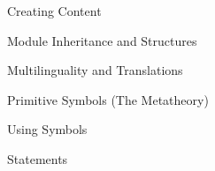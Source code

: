 \begin{sfragment}{Creating \sTeX Content}
\begin{sfragment}{Module Inheritance and Structures}
\begin{sfragment}{Multilinguality and Translations}
    \end{sfragment}

    
    
  \end{sfragment}

  \begin{sfragment}{Primitive Symbols (The \sTeX Metatheory)}
    
  \end{sfragment}
  
\end{sfragment}

\begin{sfragment}[id=sec.textsymbols]{Using \sTeX Symbols}
  

  

\end{sfragment}

\begin{sfragment}{\sTeX Statements}
  

  
\end{sfragment}

